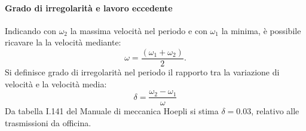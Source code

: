 \paragraph{Grado di irregolarità e lavoro eccedente}Indicando con $\omega_2$ la massima velocità nel periodo e con $\omega_1$ la minima, è possibile ricavare la la velocità mediante: 
\begin{equation}
    \omega=\frac{\left(\omega_1+\omega_2\right)}{2}.
\end{equation}
Si definisce grado di irregolarità nel periodo il rapporto tra la variazione di velocità e la velocità media: 
\begin{equation}
    \delta=\frac{\omega_2-\omega_1}{\omega}
\end{equation}
Da tabella I.141 del Manuale di meccanica Hoepli si stima $\delta=0.03$, relativo alle trasmissioni da officina.
